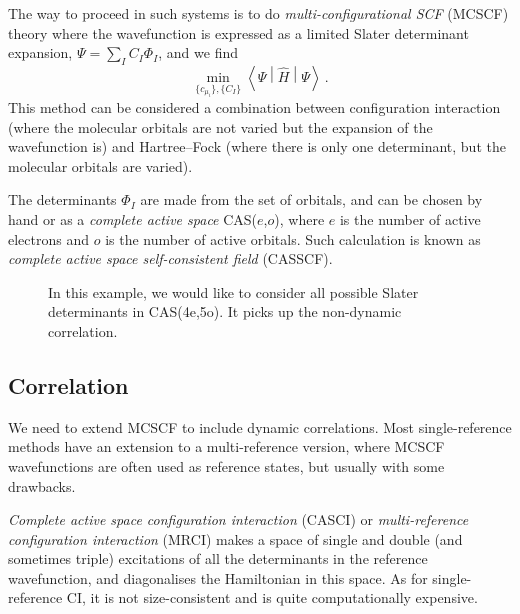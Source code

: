 \documentclass{article}
\theoremstyle{plain}\theoremheaderfont{\normalfont\itshape}\theorembodyfont{\rmfamily}\theoremseparator{.}\newtheorem*{rem}{Remark}\newtheorem*{ex}{Example}\newtheorem*{proof}{Proof}\newtheorem*{altp}{Alternative proof}
\theoremstyle{plain}\theoremheaderfont{\normalfont\bfseries}\theorembodyfont{\rmfamily}\theoremseparator{.}\newtheorem{thm}{Theorem}[section]\newtheorem{lem}[thm]{Lemma}\newtheorem{prop}[thm]{Proposition}\newtheorem*{cor}{Corollary}\newtheorem{defn}[thm]{Definition}\newtheorem{clm}[thm]{Claim}\newtheorem{clminproof}{Claim}
\theoremstyle{break}\theoremheaderfont{\normalfont\itshape}\theorembodyfont{\rmfamily}\theoremseparator{.\medskip}\newtheorem*{proofskip}{Proof}\newtheorem*{exs}{Examples}\newtheorem*{rems}{Remarks}
\theoremstyle{break}\theoremheaderfont{\normalfont\bfseries}\theorembodyfont{\rmfamily}\theoremseparator{.\medskip}\newtheorem{lemskip}[thm]{Lemma}\newtheorem{defnskip}[thm]{Definition}\newtheorem{propskip}[thm]{Proposition}\newtheorem{thmskip}[thm]{Theorem}
\numberwithin{equation}{section}
\newcommand{\expval}[2]{\left\langle #2 \middle| #1 \middle| #2 \right\rangle}
\newcommand{\x}{_{\text{x}}}
\begin{document}
    The way to proceed in such systems is to do \textit{multi-configurational SCF} (MCSCF) theory where the wavefunction is expressed as a limited Slater determinant expansion, \(\Psi=\sum_I C_I\Phi_I\), and we find
    \begin{equation}
        \min_{\{c_{\mu_i}\},\{C_I\}}\expval{\hat{H}}{\Psi}\,.
    \end{equation}
    This method can be considered a combination between configuration interaction (where the molecular orbitals are not varied but the expansion of the wavefunction is) and Hartree--Fock (where there is only one determinant, but the molecular orbitals are varied).
    
    The determinants \(\Phi_I\) are made from the set of orbitals, and can be chosen by hand or as a \textit{complete active space} CAS(\(e\),\(o\)), where \(e\) is the number of active electrons and \(o\) is the number of active orbitals. Such calculation is known as \textit{complete active space self-consistent field} (CASSCF).

    \begin{figure}[ht!]
        \centering
        \caption{In this example, we would like to consider all possible Slater determinants in CAS(4e,5o). It picks up the non-dynamic correlation.}
    \end{figure}
    \subsection{Correlation}
    We need to extend MCSCF to include dynamic correlations. Most single-reference methods have an extension to a multi-reference version, where MCSCF wavefunctions are often used as reference states, but usually with some drawbacks.

    \textit{Complete active space configuration interaction} (CASCI) or \textit{multi-reference configuration interaction} (MRCI) makes a space of single and double (and sometimes triple) excitations of all the determinants in the reference wavefunction, and diagonalises the Hamiltonian in this space. As for single-reference CI, it is not size-consistent and is quite computationally expensive.
\end{document}
